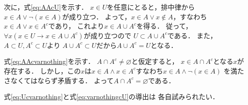 \begin{description}
  次に，式\eqref{eq:AAcU}を示す．
  $x \in U$を任意にとると，排中律から$x \in A \lor \lnot ( x \in A)$が成り立つ．
  よって，$x \in A \lor x \notin A$，すなわち$x \in A \lor x \in A^c$であり，
  これより$x \in A \cup A^c$を得る．
  従って，$\forall x( x \in U \to x \in A \cup A^c)$が成り立つので
  $U \subset A \cup A^c $である．
  また，$A \subset U,  A^c \subset U$より
  $A \cup A^c \subset U$だから$A \cup A^c =U$となる．

  式\eqref{eq:AAcvarnothing}を示す．
  $A \cap A^c \neq \varnothing$と仮定すると，
  $x \in A \cap A^c$となる$x$が存在する．
  しかし，この$x$は$x \in A \land x \in A^c$すなわち$x \in A \land \lnot(x \in A)$
  を満たさなくてはならず矛盾する．
  よって$A \cap A^c = \varnothing$である．
  
  式\eqref{eq:Ucvarnothing}と式\eqref{eq:varnothingcU}の導出は
  各自試みられたい．


\end{description}
